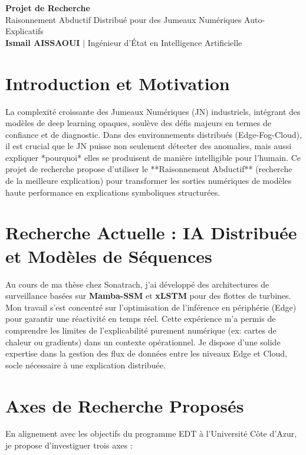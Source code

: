 \documentclass[11pt,a4paper]{article}
\begin{document}
\begin{center}
    {\LARGE\bfseries\color{titleblue} Projet de Recherche}\\[6pt]
    {\large Raisonnement Abductif Distribué pour des Jumeaux Numériques Auto-Explicatifs}\\[4pt]
    \textbf{Ismail AISSAOUI} $|$ Ingénieur d'État en Intelligence Artificielle
\end{center}

\bigskip

\section{Introduction et Motivation}
La complexité croissante des Jumeaux Numériques (JN) industriels, intégrant des modèles de deep learning opaques, soulève des défis majeurs en termes de confiance et de diagnostic. Dans des environnements distribués (Edge-Fog-Cloud), il est crucial que le JN puisse non seulement détecter des anomalies, mais aussi expliquer *pourquoi* elles se produisent de manière intelligible pour l'humain. Ce projet de recherche propose d'utiliser le **Raisonnement Abductif** (recherche de la meilleure explication) pour transformer les sorties numériques de modèles haute performance en explications symboliques structurées.

\section{Recherche Actuelle : IA Distribuée et Modèles de Séquences}
Au cours de ma thèse chez Sonatrach, j'ai développé des architectures de surveillance basées sur \textbf{Mamba-SSM} et \textbf{xLSTM} pour des flottes de turbines. Mon travail s'est concentré sur l'optimisation de l'inférence en périphérie (Edge) pour garantir une réactivité en temps réel. Cette expérience m'a permis de comprendre les limites de l'explicabilité purement numérique (ex: cartes de chaleur ou gradients) dans un contexte opérationnel. Je dispose d'une solide expertise dans la gestion des flux de données entre les niveaux Edge et Cloud, socle nécessaire à une explication distribuée.

\section{Axes de Recherche Proposés}
En alignement avec les objectifs du programme EDT à l'Université Côte d'Azur, je propose d'investiguer trois axes :
\end{document}
